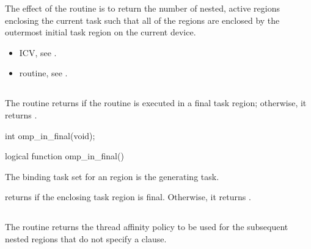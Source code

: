 \effect
The effect of the  routine is to return the number of nested, 
active  regions enclosing the current task such that all of the  
regions are enclosed by the outermost initial task region on the current device. 

\crossreferences
\begin{itemize}
\item {} ICV, see 
.

\item {} routine, see 
. 
\end{itemize}











\subsection{}
\label{subsec:omp_in_final}
\summary
The  routine returns  if the routine is executed in a final task 
region; otherwise, it returns .

\format
\ccppspecificstart
\begin{boxedcode}
int omp\_in\_final(void);
\end{boxedcode}
\ccppspecificend

\fortranspecificstart
\begin{boxedcode}
logical function omp\_in\_final()
\end{boxedcode}
\fortranspecificend

\binding
The binding task set for an  region is the generating task.

\effect
{} returns  if the enclosing task region is final. Otherwise, it returns 
.










\subsection{}
\label{subsec:omp_get_proc_bind}
\summary
The  routine returns the thread affinity policy to be used for the 
subsequent nested  regions that do not specify a  clause.

